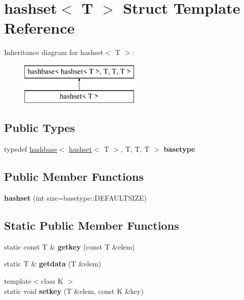 \hypertarget{structhashset}{}\section{hashset$<$ T $>$ Struct Template Reference}
\label{structhashset}
Inheritance diagram for hashset$<$ T $>$\+:\begin{figure}[H]
\begin{center}
\leavevmode
\includegraphics[height=2.000000cm]{structhashset}
\end{center}
\end{figure}
\subsection*{Public Types}
\begin{DoxyCompactItemize}
\item 
\mbox{\label{structhashset_ae5d30803fe1cb2a38de47a93a0d9ed7a}} 
typedef \hyperlink{structhashbase}{hashbase}$<$ \hyperlink{structhashset}{hashset}$<$ T $>$, T, T, T $>$ {\bfseries basetype}
\end{DoxyCompactItemize}
\subsection*{Public Member Functions}
\begin{DoxyCompactItemize}
\item 
\mbox{\label{structhashset_a68388a2d354e5ea6bc8872248b888150}} 
{\bfseries hashset} (int size=basetype\+::\+D\+E\+F\+A\+U\+L\+T\+S\+I\+ZE)
\end{DoxyCompactItemize}
\subsection*{Static Public Member Functions}
\begin{DoxyCompactItemize}
\item 
\mbox{\label{structhashset_a2be80c77c4a0cefdfeaf41166dfea3d6}} 
static const T \& {\bfseries getkey} (const T \&elem)
\item 
\mbox{\label{structhashset_ae34c3744742868fe30b9d5a25c793b25}} 
static T \& {\bfseries getdata} (T \&elem)
\item 
\mbox{\label{structhashset_adb277a04e78c4730d3aeffb8f2c795c9}} 
{\footnotesize template$<$class K $>$ }\\static void {\bfseries setkey} (T \&elem, const K \&key)
\end{DoxyCompactItemize}
